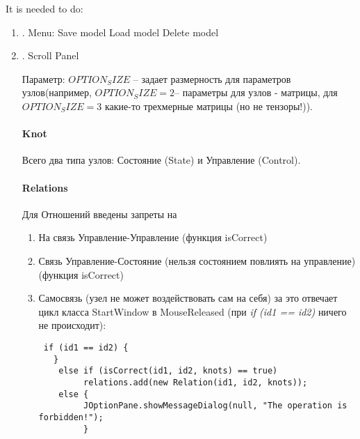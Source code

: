 \documentclass{article}
\begin{document}
\pagestyle{empty}

It is needed to do:
\begin{enumerate}
\item{.} Menu:
 Save model
 Load model
 Delete model

\item{.}  Scroll Panel

Параметр: $OPTION_SIZE$ -- задает размерность для параметров узлов(например, $OPTION_SIZE = 2$-- параметры для узлов - матрицы, для $OPTION_SIZE = 3$ какие-то трехмерные матрицы (но не тензоры!)).

\paragraph{Knot}
Всего два типа узлов: Состояние (State) и Управление (Control).


\paragraph{Relations} 
Для Отношений введены запреты на 
\begin{enumerate}
\item На связь Управление-Управление (функция isCorrect)
\item Связь Управление-Состояние (нельзя состоянием повлиять на управление) (функция isCorrect)
\item Самосвязь (узел не может воздействовать сам на себя) за это отвечает цикл класса StartWindow
в MouseReleased (при {\it{if (id1 == id2)}} ничего не происходит):
\begin{verbatim}
 if (id1 == id2) {
   }
    else if (isCorrect(id1, id2, knots) == true)
         relations.add(new Relation(id1, id2, knots));
    else {
         JOptionPane.showMessageDialog(null, "The operation is forbidden!");
         }
\end{verbatim}


\end{enumerate}



\end{enumerate}
\end{document}

